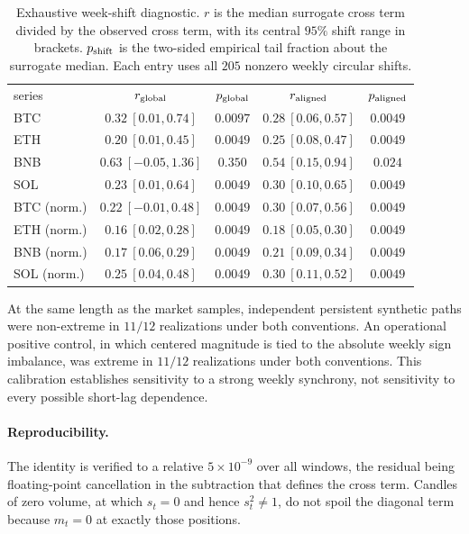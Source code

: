 \documentclass[aps,pre,onecolumn,superscriptaddress,floatfix,nofootinbib]{revtex4-2}
\begin{document}
\begin{table}[t]
\caption{Exhaustive week-shift diagnostic. $r$ is the median surrogate cross
term divided by the observed cross term, with its central $95\%$ shift range in
brackets. $p_{\rm shift}$ is the two-sided empirical tail fraction about the
surrogate median. Each entry uses all $205$ nonzero weekly circular shifts.}
\label{tab:supp-weekshift}
\begin{ruledtabular}
\begin{tabular}{lcc|cc}
series & $r_{\rm global}$ & $p_{\rm global}$ & $r_{\rm aligned}$ & $p_{\rm aligned}$ \\
\colrule
BTC & $0.32\ [0.01,0.74]$ & $0.0097$ & $0.28\ [0.06,0.57]$ & $0.0049$ \\
ETH & $0.20\ [0.01,0.45]$ & $0.0049$ & $0.25\ [0.08,0.47]$ & $0.0049$ \\
BNB & $0.63\ [-0.05,1.36]$ & $0.350$ & $0.54\ [0.15,0.94]$ & $0.024$ \\
SOL & $0.23\ [0.01,0.64]$ & $0.0049$ & $0.30\ [0.10,0.65]$ & $0.0049$ \\
BTC (norm.) & $0.22\ [-0.01,0.48]$ & $0.0049$ & $0.30\ [0.07,0.56]$ & $0.0049$ \\
ETH (norm.) & $0.16\ [0.02,0.28]$ & $0.0049$ & $0.18\ [0.05,0.30]$ & $0.0049$ \\
BNB (norm.) & $0.17\ [0.06,0.29]$ & $0.0049$ & $0.21\ [0.09,0.34]$ & $0.0049$ \\
SOL (norm.) & $0.25\ [0.04,0.48]$ & $0.0049$ & $0.30\ [0.11,0.52]$ & $0.0049$ \\
\end{tabular}
\end{ruledtabular}
\end{table}

At the same length as the market samples, independent persistent synthetic
paths were non-extreme in $11/12$ realizations under both conventions. An
operational positive control, in which centered magnitude is tied to the
absolute weekly sign imbalance, was extreme in $11/12$ realizations under both
conventions. This calibration establishes sensitivity to a strong weekly
synchrony, not sensitivity to every possible short-lag dependence.

\paragraph*{Reproducibility.}
The identity is verified to a relative $5\times10^{-9}$ over all windows, the
residual being floating-point cancellation in the subtraction that defines the
cross term. Candles of zero volume, at which $s_t=0$ and hence $s_t^2\neq1$, do
not spoil the diagonal term because $m_t=0$ at exactly those positions.
\end{document}
